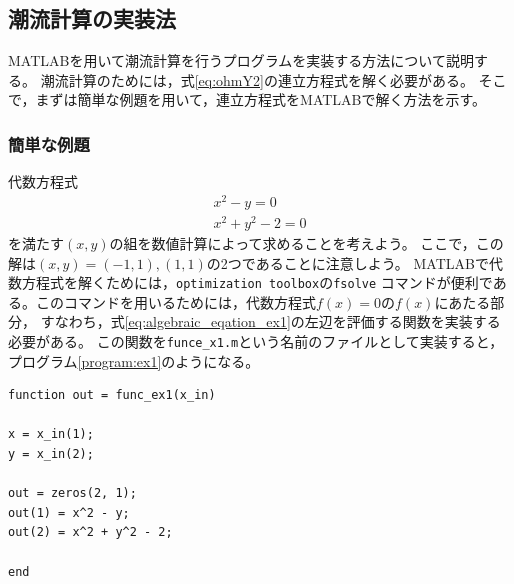 \documentclass[tombow,dvipdfmx]{corona-a5-1.1}
\begin{document}
\begin{例}[データシートに基づく潮流計算]
\end{例}



\begin{例}[経済性を考慮した潮流計算]\label{ex:pflow}
\end{例}


\subsection{潮流計算の実装法}

MATLABを用いて潮流計算を行うプログラムを実装する方法について説明する。
潮流計算のためには，式\ref{eq:ohmY2}の連立方程式を解く必要がある。
そこで，まずは簡単な例題を用いて，連立方程式をMATLABで解く方法を示す。
\subsubsection{簡単な例題}
代数方程式
\begin{subequations}\label{eq:algeblaic_equation_ex1}
\begin{align}
x^2 - y = 0\\
x^2 + y^2 - 2 = 0
\end{align}
\end{subequations}
を満たす$(x, y)$の組を数値計算によって求めることを考えよう。
ここで，この解は$(x, y) = (-1, 1), (1, 1)$の2つであることに注意しよう。
MATLABで代数方程式を解くためには，\texttt{optimization toolbox}の\texttt{fsolve}
コマンドが便利である。このコマンドを用いるためには，代数方程式$f(x)=0$の$f(x)$にあたる部分，
すなわち，式\eqref{eq:algebraic_eqation_ex1}の左辺を評価する関数を実装する必要がある。
この関数を\texttt{funce\_x1.m}という名前のファイルとして実装すると，
プログラム\nobreak\ref{program:ex1}のようになる。

\begin{PROGRAMA}[count,title={func\_ex1.m}]\label{program:ex1}
\begin{verbatim}
function out = func_ex1(x_in)

x = x_in(1);
y = x_in(2);

out = zeros(2, 1);
out(1) = x^2 - y;
out(2) = x^2 + y^2 - 2;

end
\end{verbatim}
\end{PROGRAMA}
\end{document}
